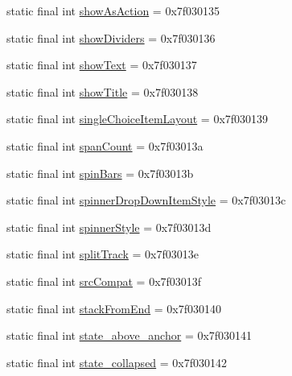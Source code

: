 \begin{DoxyCompactItemize}
\item 
static final int \mbox{\hyperlink{classandroid_1_1support_1_1design_1_1R_1_1attr_a65f3be01de445a1c54d6686b1db7e0a6}{show\+As\+Action}} = 0x7f030135
\item 
static final int \mbox{\hyperlink{classandroid_1_1support_1_1design_1_1R_1_1attr_acae95fa1917264bc837b5d2e2bb5fe72}{show\+Dividers}} = 0x7f030136
\item 
static final int \mbox{\hyperlink{classandroid_1_1support_1_1design_1_1R_1_1attr_a2365c2af635790d16f8a9f9b7c3a7c30}{show\+Text}} = 0x7f030137
\item 
static final int \mbox{\hyperlink{classandroid_1_1support_1_1design_1_1R_1_1attr_a8408032aedc95b0a6fadef46927827af}{show\+Title}} = 0x7f030138
\item 
static final int \mbox{\hyperlink{classandroid_1_1support_1_1design_1_1R_1_1attr_a3ce837e924669fb989055820e631240b}{single\+Choice\+Item\+Layout}} = 0x7f030139
\item 
static final int \mbox{\hyperlink{classandroid_1_1support_1_1design_1_1R_1_1attr_ada5b54d6273628222f5a1de8866f4e3a}{span\+Count}} = 0x7f03013a
\item 
static final int \mbox{\hyperlink{classandroid_1_1support_1_1design_1_1R_1_1attr_adff87e37465b90dff01bb2901718b709}{spin\+Bars}} = 0x7f03013b
\item 
static final int \mbox{\hyperlink{classandroid_1_1support_1_1design_1_1R_1_1attr_a23cd5b3b1d92d5e57dce54fa52899a3b}{spinner\+Drop\+Down\+Item\+Style}} = 0x7f03013c
\item 
static final int \mbox{\hyperlink{classandroid_1_1support_1_1design_1_1R_1_1attr_af63b91427a10016870216dade2a2b124}{spinner\+Style}} = 0x7f03013d
\item 
static final int \mbox{\hyperlink{classandroid_1_1support_1_1design_1_1R_1_1attr_a577a44a0a7299eea4cd856ceea540032}{split\+Track}} = 0x7f03013e
\item 
static final int \mbox{\hyperlink{classandroid_1_1support_1_1design_1_1R_1_1attr_ac91bf05ac7ffb9eae060e5565db9d50c}{src\+Compat}} = 0x7f03013f
\item 
static final int \mbox{\hyperlink{classandroid_1_1support_1_1design_1_1R_1_1attr_ab745dd7969ca01445b027b8a29076de5}{stack\+From\+End}} = 0x7f030140
\item 
static final int \mbox{\hyperlink{classandroid_1_1support_1_1design_1_1R_1_1attr_a8eafe096a496ac81741c757ac0909925}{state\+\_\+above\+\_\+anchor}} = 0x7f030141
\item 
static final int \mbox{\hyperlink{classandroid_1_1support_1_1design_1_1R_1_1attr_a357530c3caaaf03e14170466ce0c7312}{state\+\_\+collapsed}} = 0x7f030142

\end{DoxyCompactItemize}
